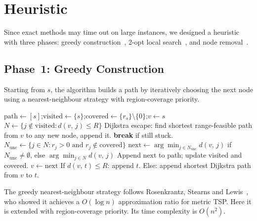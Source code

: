 \documentclass[12pt, a4paper]{article}
\newcommand{\dist}[2]{d(#1,\,#2)}
\begin{document}
\section{Heuristic}

Since exact methods may time out on large instances, we designed a heuristic with
three phases: greedy construction~\cite{nn_heuristic}, 2-opt local
search~\cite{lin2opt}, and node removal~\cite{lk}.

\subsection{Phase~1: Greedy Construction}

Starting from $s$, the algorithm builds a path by iteratively choosing the next node
using a nearest-neighbour strategy with region-coverage priority.

\begin{algorithm}[H]
\caption{Greedy construction}
\begin{algorithmic}[1]
\State $\text{path} \leftarrow [s]$;\quad $\text{visited} \leftarrow \{s\}$;\quad $\text{covered} \leftarrow \{r_s\} \setminus \{0\}$;\quad $v \leftarrow s$
  \State $N \leftarrow \{j \notin \text{visited} : \dist{v}{j} \leq R\}$
    \State Dijkstra escape: find shortest range-feasible path from $v$ to any new node, append it.
    \State \textbf{break} if still stuck.
  \EndIf
  \State $N_{\text{unc}} \leftarrow \{j \in N : r_j > 0 \text{ and } r_j \notin \text{covered}\}$
  \State $\text{next} \leftarrow \arg\min_{j \in N_{\text{unc}}} \dist{v}{j}$ \quad if $N_{\text{unc}} \neq \emptyset$, \quad else $\arg\min_{j \in N} \dist{v}{j}$
  \State Append $\text{next}$ to path; update visited and covered.
  \State $v \leftarrow \text{next}$
\EndWhile
{}
  \State If $\dist{v}{t} \leq R$: append $t$.
  \State Else: append shortest Dijkstra path from $v$ to $t$.
\EndIf
\end{algorithmic}
\end{algorithm}

The greedy nearest-neighbour strategy follows Rosenkrantz, Stearns and
Lewis~\cite{nn_heuristic}, who showed it achieves a $O(\log n)$ approximation ratio
for metric TSP. Here it is extended with region-coverage priority.
Its time complexity is $O(n^2)$.
\end{document}
